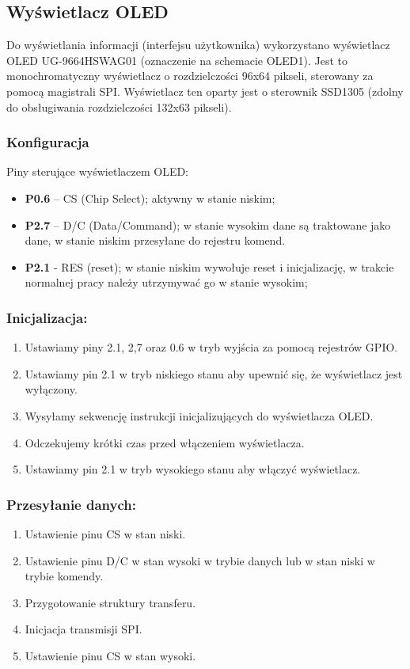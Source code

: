 \subsection{Wyświetlacz OLED}

Do wyświetlania informacji (interfejsu użytkownika) wykorzystano wyświetlacz OLED UG-9664HSWAG01 (oznaczenie na schemacie OLED1). Jest to monochromatyczny wyświetlacz o rozdzielczości 96x64 pikseli, sterowany za pomocą magistrali SPI. Wyświetlacz ten oparty jest o sterownik SSD1305 (zdolny do obsługiwania rozdzielczości 132x63 pikseli).

\subsubsection{Konfiguracja}
Piny sterujące wyświetlaczem OLED:
\begin{itemize}
\item \textbf{P0.6} – CS (Chip Select); aktywny w stanie niskim;
\item \textbf{P2.7} – D/C (Data/Command); w stanie wysokim dane są traktowane jako dane, w stanie niskim przesyłane do rejestru komend.
\item \textbf{P2.1} - RES (reset); w stanie niskim wywołuje reset i inicjalizację, w trakcie normalnej pracy należy utrzymywać go w stanie wysokim;
\end{itemize}
\subsubsection {Inicjalizacja:}
\begin{enumerate}
    \item Ustawiamy piny 2.1, 2,7 oraz 0.6 w tryb wyjścia za pomocą rejestrów GPIO. %
    \item Ustawiamy pin 2.1 w tryb niskiego stanu aby upewnić się, że wyświetlacz jest wyłączony.
    \item Wysyłamy sekwencję instrukcji inicjalizujących do wyświetlacza OLED.
    \item Odczekujemy krótki czas przed włączeniem wyświetlacza.
    \item Ustawiamy pin 2.1 w tryb wysokiego stanu aby włączyć wyświetlacz.
\end{enumerate}
\subsubsection {Przesyłanie danych:}
\label{przes}
\begin{enumerate}
    \item Ustawienie pinu CS w stan niski.
    \item Ustawienie pinu D/C w stan wysoki w trybie danych lub w stan niski w trybie komendy.
    \item Przygotowanie struktury transferu.
    \item Inicjacja transmisji SPI.
    \item Ustawienie pinu CS w stan wysoki.
\end{enumerate}

